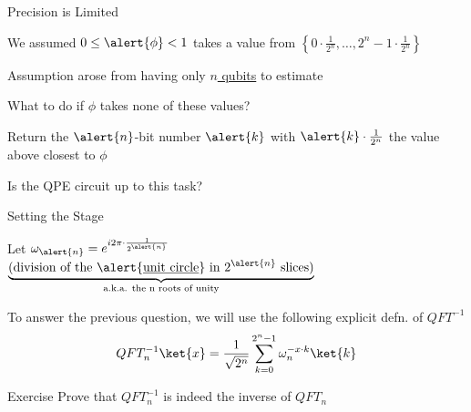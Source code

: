 \documentclass{beamer}
\begin{document}
\begin{frame}{Precision is Limited}

        We assumed $0 \leq \alert{\phi} < 1$ takes a value from $\left \{
        0 \cdot \frac{1}{2^n}, \dots, 2^{n} - 1 \cdot
        \frac{1}{2^n} \right \}$

        Assumption arose from having only \alert{\underline{$n$ qubits}}
        to estimate 

        What to do if $\phi$ takes none of these values?

        \pause
        Return the $\alert{n}$-bit number $\alert{k}$ with $\alert{k} \cdot
        \frac{1}{2^n}$ the value above \alert{closest} to $\phi$

        \pause
        Is the QPE circuit up to this task?
\end{frame}

\begin{frame}{Setting the Stage}

        Let $\omega_{\alert{n}} = e^{i 2 \pi \cdot \frac{1}{2^{\alert{n}}}}$
        $\underbrace{\text{(division of the \alert{\underline{unit circle}} in
        $2^{\alert{n}}$ slices)}}_{\text{a.k.a. the n roots of unity}}$

        \vspace{0.3cm}
        To answer the previous question, we will use the following explicit
        defn. of $QFT^{-1}$
        \[
                QFT^{-1}_n \ket{x} = 
                \frac{1}{\sqrt{2^n}} \sum_{k = 0}^{2^n -1}
                \omega_n^{-x \cdot k} \ket{k}
        \]

        \pause
        \begin{block}{Exercise}
                Prove that $QFT^{-1}_n$ is indeed the inverse
                of $QFT_n$
        \end{block}
\end{frame} 
\end{document}
